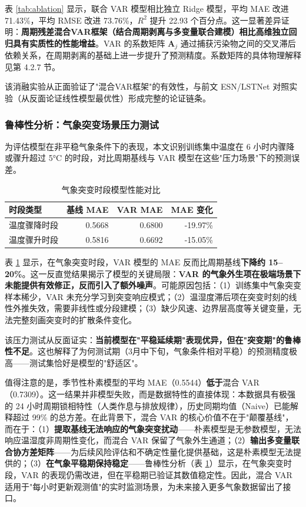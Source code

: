 \documentclass[UTF8,a4paper,12pt]{ctexart}
\begin{document}
表 \ref{tab:ablation} 显示，联合 VAR 模型相比独立 Ridge 模型，平均 MAE 改进 71.43\%，平均 RMSE 改进 73.76\%，$R^2$ 提升 22.93 个百分点。这一显著差异证明：\textbf{周期残差混合VAR框架（结合周期剥离与多变量联合建模）相比高维独立回归具有实质性的性能增益}。VAR 的系数矩阵 $\mathbf{A}_j$ 通过捕获污染物之间的交叉滞后依赖关系，在周期剥离的基础上进一步提升了预测精度。系数矩阵的具体物理解释见第 4.2.7 节。

该消融实验从正面验证了"混合VAR框架"的有效性，与前文 ESN/LSTNet 对照实验（从反面论证线性模型最优性）形成完整的论证链条。

\subsubsection{鲁棒性分析：气象突变场景压力测试}

为评估模型在非平稳气象条件下的表现，本文识别训练集中温度在 6 小时内骤降或骤升超过 5°C 的时段，对比周期基线与 VAR 模型在这些"压力场景"下的预测误差。

\begin{table}[H]
\centering
\caption{气象突变时段模型性能对比}
\label{tab:robustness}
\small
\begin{tabular}{lrrr}
\toprule
时段类型 & 基线 MAE & VAR MAE & MAE 变化\\
\midrule
温度骤降时段 & 0.5668 & 0.6800 & -19.97\%\\
温度骤升时段 & 0.5816 & 0.6692 & -15.05\%\\
\bottomrule
\end{tabular}
\end{table}

表 \ref{tab:robustness} 显示，在气象突变时段，VAR 模型的 MAE 反而比周期基线\textbf{下降约 15--20\%}。这一反直觉结果揭示了模型的关键局限：\textbf{VAR 的气象外生项在极端场景下未能提供有效修正，反而引入了额外噪声}。可能原因包括：（1）训练集中气象突变样本稀少，VAR 未充分学习到突变响应模式；（2）温湿度滞后项在突变时刻的线性外推失效，需要非线性或分段建模；（3）缺少风速、边界层高度等关键变量，无法完整刻画突变时的扩散条件变化。

该压力测试从反面证实：\textbf{当前模型在"平稳延续期"表现优异，但在"突变期"的鲁棒性不足}。这也解释了为何测试期（3月中下旬，气象条件相对平稳）的预测精度极高——测试集恰好是模型的"舒适区"。

值得注意的是，季节性朴素模型的平均 MAE（0.5544）\textbf{低于}混合 VAR（0.7309）。这一结果并非模型失败，而是数据特性的直接体现：本数据具有极强的 24 小时周期锁相特性（人类作息与排放规律），历史同期均值（Naive）已能解释超过 99\% 的总方差。在此背景下，混合 VAR 的核心价值不在于"颠覆基线"，而在于：（1）\textbf{提取基线无法响应的气象突变扰动}——朴素模型是无参数模型，无法响应温湿度非周期性变化，而混合 VAR 保留了气象外生通道；（2）\textbf{输出多变量联合协方差矩阵}——为后续风险评估和不确定性量化提供基础，这是朴素模型无法提供的；（3）\textbf{在气象平稳期保持稳定}——鲁棒性分析（表 \ref{tab:robustness}）显示，在气象突变时段，VAR 的表现仍需改进，但在平稳期已验证其数值稳定性。因此，混合 VAR 适用于"每小时更新观测值"的实时监测场景，为未来接入更多气象数据留出了接口。
\end{document}
